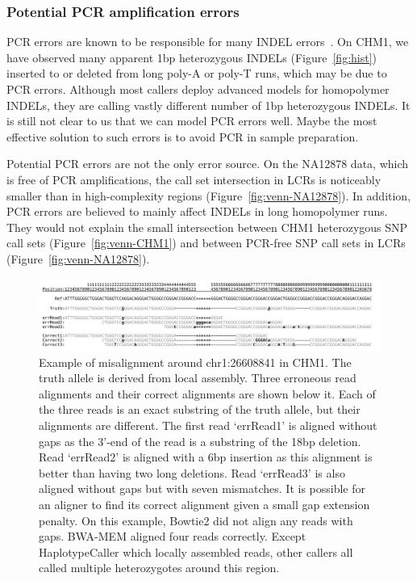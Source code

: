 \documentclass{bioinfo}
\begin{document}
\subsubsection{Potential PCR amplification errors}
PCR errors are known to be responsible for many INDEL
errors~\citep{1000g:2012aa}. On CHM1, we have observed many apparent 1bp
heterozygous INDELs (Figure~\ref{fig:hist}) inserted to or deleted from long
poly-A or poly-T runs, which may be due to PCR errors. Although most callers
deploy advanced models for homopolymer INDELs, they are calling vastly
different number of 1bp heterozygous INDELs. It is still not clear to us that
we can model PCR errors well. Maybe the most effective solution to such errors
is to avoid PCR in sample preparation.

Potential PCR errors are not the only error source. On the NA12878 data, which
is free of PCR amplifications, the call set intersection in LCRs is noticeably
smaller than in high-complexity regions (Figure~\ref{fig:venn-NA12878}). In
addition, PCR errors are believed to mainly affect INDELs in long homopolymer
runs. They would not explain the small intersection between CHM1 heterozygous
SNP call sets (Figure~\ref{fig:venn-CHM1}) and between PCR-free SNP call sets
in LCRs (Figure~\ref{fig:venn-NA12878}).

\begin{figure}
\includegraphics[width=\textwidth]{indel-exam}
\caption{Example of misalignment around chr1:26608841 in CHM1. The truth allele
is derived from local assembly. Three erroneous read alignments and their
correct alignments are shown below it. Each of the three reads is an exact
substring of the truth allele, but their alignments are different.  The first
read `errRead1' is aligned without gaps as the 3'-end of the read is a
substring of the 18bp deletion.  Read `errRead2' is aligned with a 6bp
insertion as this alignment is better than having two long deletions. Read
`errRead3' is also aligned without gaps but with seven mismatches. It is
possible for an aligner to find its correct alignment given a small gap
extension penalty. On this example, Bowtie2 did not align any reads with gaps.
BWA-MEM aligned four reads correctly. Except HaplotypeCaller which locally
assembled reads, other callers all called multiple heterozygotes around this
region.}\label{fig:realign}
\end{figure}
\end{document}
